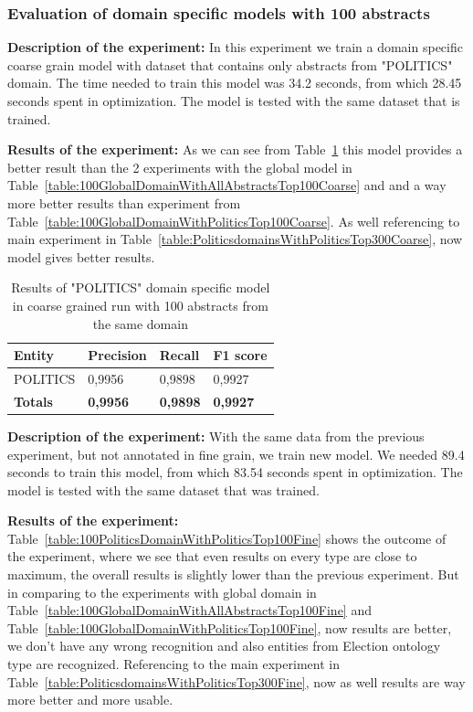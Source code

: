 \documentclass[thesis=M,english]{FITthesis}[2018/05/30]
\begin{document}
\subsubsection{Evaluation of domain specific models with 100 abstracts}

	\textbf{Description of the experiment:} In this experiment we train a domain specific coarse grain model with dataset that contains only abstracts from "POLITICS" domain. The time needed to train this model was 34.2 seconds, from which 28.45 seconds spent in optimization. The model is tested with the same dataset that is trained.

	\textbf{Results of the experiment:} As we can see from Table~\ref{table:100PoliticsDomainWithPoliticsTop100Coarse} this model provides a better result than the 2 experiments with the global model in Table~\ref{table:100GlobalDomainWithAllAbstractsTop100Coarse} and and a way more better results than experiment from Table~\ref{table:100GlobalDomainWithPoliticsTop100Coarse}. As well referencing to main experiment in Table~\ref{table:PoliticsdomainsWithPoliticsTop300Coarse}, now model gives better results. 

	\begin{table}[H]\centering
		\begin{tabular}{|l|l|l|l|}
			\hline {\textbf{Entity}} & {\textbf{Precision}} & {\textbf{Recall}} & {\textbf{F1 score}}\\\hline
				POLITICS & 0,9956 & 0,9898 & 0,9927\\\hline
				\textbf{Totals} & \textbf{0,9956} & \textbf{0,9898} & \textbf{0,9927}\\\hline
		\end{tabular}
		\caption{Results of "POLITICS" domain specific model in coarse grained run with 100 abstracts from the same domain \label{table:100PoliticsDomainWithPoliticsTop100Coarse}}
	\end{table}


	\textbf{Description of the experiment:} With the same data from the previous experiment, but not annotated in fine grain, we train new model. We needed 89.4 seconds to train this model, from which 83.54 seconds spent in optimization. The model is tested with the same dataset that was trained.

	\textbf{Results of the experiment:} Table~\ref{table:100PoliticsDomainWithPoliticsTop100Fine} shows the outcome of the experiment, where we see that even results on every type are close to maximum, the overall results is slightly lower than the previous experiment. But in comparing to the experiments with global domain in Table~\ref{table:100GlobalDomainWithAllAbstractsTop100Fine} and Table~\ref{table:100GlobalDomainWithPoliticsTop100Fine}, now results are better, we don't have any wrong recognition and also entities from Election ontology type are recognized. Referencing to the main experiment in Table~\ref{table:PoliticsdomainsWithPoliticsTop300Fine}, now as well results are way more better and more usable.
\end{document}
